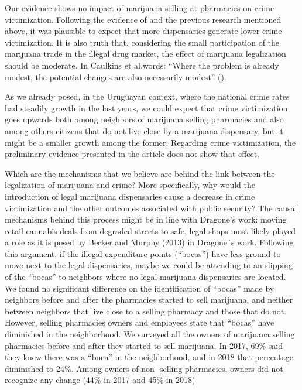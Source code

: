 \documentclass[11pt]{article}
\begin{document}
Our evidence shows no impact of marijuana selling at pharmacies on crime victimization. Following the evidence of \cite{dragone2019crime} and the previous research mentioned above, it was plausible to expect that more dispensaries generate lower crime victimization. It is also truth that, considering the small participation of the marijuana trade in the illegal drug market, the effect of marijuana legalization should be moderate. In Caulkins et al.words: ``Where the problem is already modest, the potential changes are also necessarily modest'' (\citet[154]{caulkins2015considering}).

As we already posed, in the Uruguayan context, where the national crime rates had steadily growth in the last years, we could expect that crime victimization goes upwards both among neighbors of marijuana selling pharmacies and also among others citizens that do not live close by a marijuana dispensary, but it might be a smaller growth among the former. Regarding crime victimization, the preliminary evidence presented in the article does not show that effect.

Which are the mechanisms that we believe are behind the link between the legalization of marijuana and crime? More specifically, why would the introduction of legal marijuana dispensaries cause a decrease in crime victimization and the other outcomes associated with public security? The causal mechanisms behind this process might be in line with Dragone's work: moving retail cannabis deals from degraded streets to safe, legal shops most likely played a role as it is posed by Becker and Murphy (2013) in Dragone´s work. Following this argument, if the illegal expenditure points (``bocas'') have less ground to move next to the legal dispensaries, maybe we could be attending to an slipping of the ``bocas'' to neighbors where no legal marijuana dispensaries are located. We found no significant difference on the identification of ``bocas'' made by neighbors before and after the pharmacies started to sell marijuana, and neither between neighbors that live close to a selling pharmacy and those that do not. However, selling pharmacies owners and employees state that ``bocas'' have diminished in the neighborhood. We surveyed all the owners of marijuana selling pharmacies before and after they started to sell marijuana. In 2017, 69\% said they knew there was a ``boca'' in the neighborhood, and in 2018 that percentage diminished to 24\%. Among owners of non- selling pharmacies, owners did not recognize any change (44\% in 2017 and 45\% in 2018)
\end{document}
